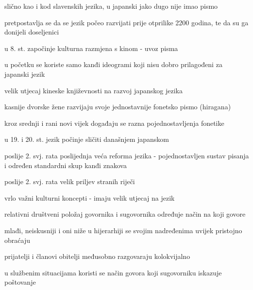 	\begin{hyou}
		\item slično kao i kod slavenskih jezika, u japanski jako dugo nije imao pismo
		\item pretpostavlja se da se jezik počeo razvijati prije otprilike 2200 godina, te da su ga donijeli doseljenici
		\item u 8. st. započinje kulturna razmjena s kinom - uvoz pisma
		\item u početku se koriste samo kanđi ideogrami koji nisu dobro prilagođeni za japanski jezik
		\item velik utjecaj kineske književnosti na razvoj japanskog jezika
		\item kasnije dvorske žene razvijaju svoje jednostavnije fonetsko pismo (hiragana)
		\item kroz srednji i rani novi vijek događaju se razna pojednostavljenja fonetike
		\item u 19. i 20. st. jezik počinje sličiti današnjem japanskom
		\item poslije 2. svj. rata poslijednja veća reforma jezika - pojednostavljen sustav pisanja i određen standardni skup kanđi znakova
		\item poslije 2. svj. rata velik priljev stranih riječi
	\end{hyou}

	\begin{hyou}
		\item vrlo važni kulturni koncepti - imaju velik utjecaj na jezik
		\item relativni društveni položaj govornika i sugovornika određuje način na koji govore
		\item mlađi, neiskusniji i oni niže u hijerarhiji se svojim nadređenima uvijek pristojno obraćaju
		\item prijatelji i članovi obitelji međusobno razgovaraju kolokvijalno
		\item u službenim situacijama koristi se način govora koji sugovorniku iskazuje poštovanje
	\end{hyou}
